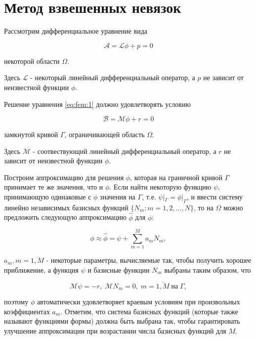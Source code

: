 \documentclass[14pt]{extreport}
\begin{document}
\section{Метод взвешенных невязок}

Рассмотрим дифференциальное уравнение вида

\begin{equation}\label{eq:fem:1}
 \mathcal A= \mathcal L\phi + p=0
\end{equation}

 некоторой области $\Omega$.

Здесь $\mathcal L$ - некоторый линейный дифференциальный оператор, а $p$ не зависит от неизвестной функции $\phi$.

Решение уравнения \ref{eq:fem:1} должно удовлетворять условию

\begin{equation}\label{eq:fem:2}
\mathcal B = \mathcal M \phi+r=0
\end{equation}

 замкнутой кривой $\Gamma$, ограничивающей область $\Omega$.

Здесь $\mathcal M$ - соотвествующий линейный дифференциальный оператор, а $r$ не зависит от неизвестной функции $\phi$.

Построим аппроксимацию для решения $\phi$, которая на граничной кривой $\Gamma$ принимает те же значения, что и $\phi$. Если найти некоторую функцию $\psi$, принимающую одинаковые с $\phi$ значения на $\Gamma$, т.е. $\psi|_\Gamma= \phi|_\Gamma$, и ввести систему линейно независимых базисных функций $\{N_m; m = 1,2, \dots, N\}$, то на $\Omega$ можно предложить следующую аппроксимацию $\hat{\phi}$ для $\phi$: 

\begin{equation}\label{eq:fem:3}
\phi \approx \hat\phi = \psi + \sum\limits_{m=1}^{M} a_mN_m,
\end{equation}

 $a_m, m= \overline{1,M}$ - некоторые параметры, вычисляемые так, чтобы получить хорошее приближение, а функция $\psi$ и базисные функции $N_m$ выбраны таким образом, что

\begin{equation}\label{eq:fem:4}
 \mathcal M\psi=-r, \; \mathcal M N_m=0, \; m=\overline{1,M} \; \text{на} \; \Gamma,
\end{equation}

 поэтому $\phi$ автоматически удовлетворяет краевым условиям \cite{eq:fem:2} при произвольных коэффициентах $a_m$. Отметим, что система базисных функций (которые также называют функциями формы) должна быть выбрана так, чтобы гарантировать улучшение аппроксимации при возрастании числа базисных функций для $M$.
\end{document}
